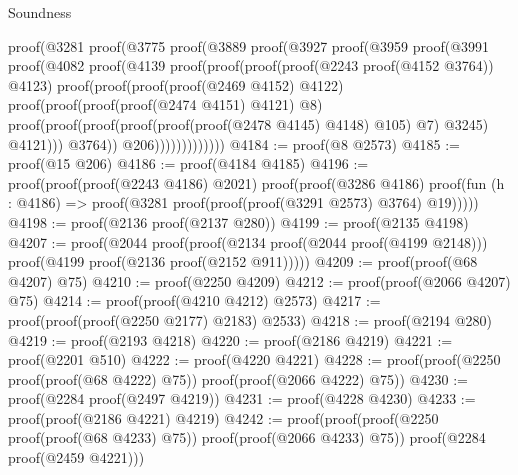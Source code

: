 \begin{lexlean}{Soundness}
\begin{coremodule}
              proof(@3281
                  proof(@3775
                      proof(@3889
                          proof(@3927
                              proof(@3959
                                  proof(@3991
                                      proof(@4082
                                          proof(@4139
                                              proof(proof(proof(proof(@2243 proof(@4152 @3764))
                                                      @4123)
                                                    proof(proof(proof(proof(@2469 @4152) @4122)
                                                          proof(proof(proof(proof(@2474 @4151)
                                                                  @4121)
                                                                @8)
                                                              proof(proof(proof(proof(proof(proof(@2478
                                                                            @4145)
                                                                          @4148)
                                                                        @105)
                                                                      @7)
                                                                    @3245)
                                                                  @4121)))
                                                        @3764))
                                                  @206)))))))))))))
@4184 := proof(@8 @2573)
@4185 := proof(@15 @206)
@4186 := proof(@4184 @4185)
@4196 := proof(proof(proof(@2243 @4186) @2021)
      proof(proof(@3286 @4186)
          proof(fun (h : @4186) => proof(@3281 proof(proof(proof(@3291 @2573) @3764) @19)))))
@4198 := proof(@2136 proof(@2137 @280))
@4199 := proof(@2135 @4198)
@4207 := proof(@2044
      proof(proof(@2134 proof(@2044 proof(@4199 @2148)))
          proof(@4199 proof(@2136 proof(@2152 @911)))))
@4209 := proof(proof(@68 @4207) @75)
@4210 := proof(@2250 @4209)
@4212 := proof(proof(@2066 @4207) @75)
@4214 := proof(proof(@4210 @4212) @2573)
@4217 := proof(proof(proof(@2250 @2177) @2183) @2533)
@4218 := proof(@2194 @280)
@4219 := proof(@2193 @4218)
@4220 := proof(@2186 @4219)
@4221 := proof(@2201 @510)
@4222 := proof(@4220 @4221)
@4228 := proof(proof(@2250 proof(proof(@68 @4222) @75)) proof(proof(@2066 @4222) @75))
@4230 := proof(@2284 proof(@2497 @4219))
@4231 := proof(@4228 @4230)
@4233 := proof(proof(@2186 @4221) @4219)
@4242 := proof(proof(proof(@2250 proof(proof(@68 @4233) @75)) proof(proof(@2066 @4233) @75))
      proof(@2284 proof(@2459 @4221)))

\end{coremodule}
\end{lexlean}
